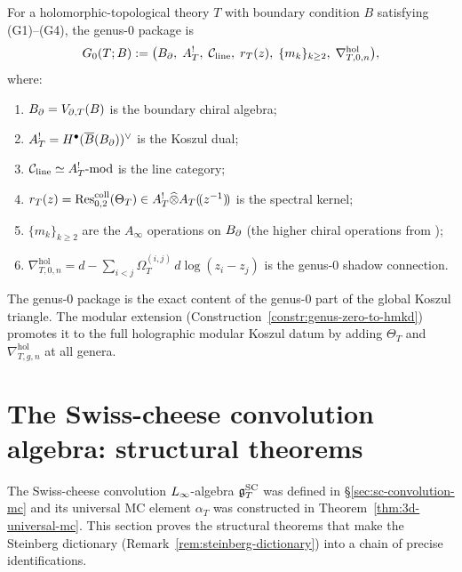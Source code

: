 \begin{definition}
For a holomorphic-topological theory $T$ with boundary
condition $B$ satisfying (G1)--(G4), the genus-$0$ package is
\begin{equation}%
G_0(T;B)
:= \bigl(
\Bbound,\;
A^!_T,\;
\cC_{\mathrm{line}},\;
r_T(z),\;
\{m_k\}_{k\ge 2},\;
\nabla^{\mathrm{hol}}_{T,0,n}
\bigr),
\end{equation}
where:
\begin{enumerate}[label=(\roman*),leftmargin=1.8em]
\item $B_{\partial}=V_{\partial,T}(B)$ is the boundary chiral algebra;
\item $A^!_T=H^\bullet(\overline{B}(B_{\partial}))^\vee$ is the Koszul dual;
\item $\mathcal C_{\mathrm{line}}\simeq A^!_T\text{-mod}$ is the line
category;
\item $r_T(z)=\operatorname{Res}^{\mathrm{coll}}_{0,2}(\Theta_T)
\in A^!_T\widehat{\otimes} A_T(\!(z^{-1})\!)$ is the spectral kernel;
\item $\{m_k\}_{k\ge 2}$ are the $A_\infty$ operations on
$B_{\partial}$ (the higher chiral operations from \cite{GKW24});
\item $\nabla^{\mathrm{hol}}_{T,0,n}
= d - \sum_{i<j}\Omega_T^{(i,j)}\,d\log(z_i-z_j)$
is the genus-$0$ shadow connection.
\end{enumerate}
The genus-$0$ package is the exact content of the genus-$0$
part of the global Koszul triangle. The modular extension
(Construction~\ref{constr:genus-zero-to-hmkd}) promotes it to
the full holographic modular Koszul datum by adding
$\Theta_T$ and $\nabla^{\mathrm{hol}}_{T,g,n}$ at all genera.
\end{definition}




\section{The Swiss-cheese convolution algebra: structural theorems}

The Swiss-cheese convolution $L_\infty$-algebra $\mathfrak{g}^{\mathrm{SC}}_T$ was
defined in \S\ref{sec:sc-convolution-mc} and its universal MC
element $\alpha_T$ was constructed in
Theorem~\ref{thm:3d-universal-mc}. This section proves the
structural theorems that make the Steinberg dictionary
(Remark~\ref{rem:steinberg-dictionary}) into a chain of precise
identifications.

